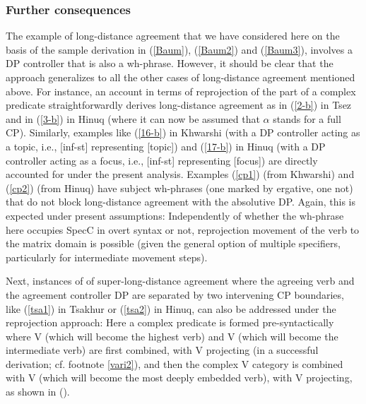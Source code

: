 \documentclass[output=paper
,modfonts
,nonflat]{langsci/langscibook}
\begin{document}
	\subsubsection{Further consequences}
	
	The example of long-distance agreement that we have considered here on
	the basis of the sample derivation in (\ref{Baum}), (\ref{Baum2}) and
	(\ref{Baum3}), involves a DP controller that is also a
	wh-phrase. However, it should be clear that the approach generalizes
	to all the other cases of long-distance agreement mentioned
	above. For instance, an account in terms of reprojection of the part
	of a complex predicate straightforwardly derives long-distance
	agreement as in (\ref{2-b}) in Tsez and in (\ref{3-b}) in Hinuq (where it can
	now be assumed that $\alpha$ stands for a full CP). Similarly,
	examples like (\ref{16-b}) in Khwarshi (with a DP controller
	acting as a topic, i.e., [inf-st] representing [topic]) and (\ref{17-b})
	in Hinuq (with a DP controller acting as a focus, i.e., [inf-st]
	representing [focus]) are directly accounted for under the present
	analysis. Examples (\ref{cp1}) (from Khwarshi) and (\ref{cp2}) (from Hinuq) have
	subject wh-phrases (one marked by ergative, one not) that do not block
	long-distance agreement with the absolutive DP. Again, this is
	expected under present assumptions: Independently of whether the
	wh-phrase here occupies SpecC in overt syntax or not, reprojection
	movement of the verb to the matrix domain is possible (given the
	general option of multiple specifiers, particularly for intermediate
	movement steps). 
	
	Next, instances of of super-long-distance agreement where the
	agreeing verb and the agreement controller DP are separated by two
	intervening CP boundaries, like (\ref{tsa1}) in Tsakhur or (\ref{tsa2}) in
	Hinuq, can also be addressed under the reprojection approach: Here a complex
	predicate is formed pre-syntactically where V (which will become the
	highest verb) and V (which will become the intermediate verb) are
	first combined, with V projecting (in a successful derivation;
	cf. footnote \ref{vari2}), and then the complex V category is
	combined with V (which will become the most deeply embedded verb),
	with V projecting, as shown in (\Next).
	
\end{document}
